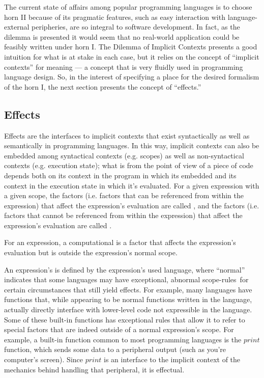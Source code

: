 The current state of affairs among popular programming languages is to choose horn II because of its pragmatic features, such as easy interaction with language-external peripheries, are so integral to software development.
In fact, as the dilemma is presented it would seem that no real-world application could be feasibly written under horn I.
The Dilemma of Implicit Contexts presents a good intuition for what is at stake in each case, but it relies on the concept of ``implicit contexts'' for meaning --- a concept that is very fluidly used in programming language design.
So, in the interest of specifying a place for the desired formalism of the horn I, the next section presents the concept of ``effects.''

\subsection{Effects}
\label{sec:effects}

Effects are the interfaces to implicit contexts that exist syntactically as well as semantically in programming languages.
In this way, implicit contexts can also be embedded among syntactical contexts (e.g. scopes) as well as non-syntactical contexts (e.g. execution state);
what is  from the point of view of a piece of code depends both on its context in the program in which its embedded and its context in the execution state in which it's evaluated.
For a given expression with a given scope,
the  factors (i.e. factors that can be referenced from within the expression) that affect the expression's evaluation are called , and
the  factors (i.e. factors that cannot be referenced from within the expression) that affect the expression's evaluation are called .

\begin{blockdefinition}
  For an expression, a computational  is a factor that affects the expression's evaluation but is outside the expression's normal scope.
\end{blockdefinition}

An expression's  is defined by the expression's used language, where ``normal'' indicates that some languages may have exceptional, abnormal scope-rules for certain circumstances that still yield effects.
For example, many languages have  functions that, while appearing to be normal functions written in the language, actually directly interface with lower-level code not expressible in the language.
Some of these built-in functions has exceptional rules that allow it to refer to special factors that are indeed outside of a normal expression's scope.
For example, a built-in function common to most programming languages is the $print$ function, which sends some data to a peripheral output (such as you're computer's screen).
Since $print$ is an interface to the implicit context of the mechanics behind handling that peripheral, it is effectual.

